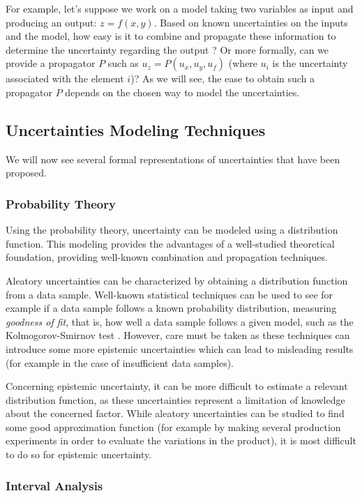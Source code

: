 For example, let's suppose we work on a model taking two variables as input and producing an output: $z=f(x,y)$.
Based on known uncertainties on the inputs and the model, how easy is it to combine and propagate these information to determine the uncertainty regarding the output ? Or more formally, can we provide a propagator $P$ such as $u_z = P(u_x, u_y, u_f)$ (where $u_i$ is the uncertainty associated with the element $i$)? As we will see, the ease to obtain such a propagator $P$ depends on the chosen way to model the uncertainties.

\subsection{Uncertainties Modeling Techniques}

We will now see several formal representations of uncertainties that have been proposed.

\subsubsection{Probability Theory}

Using the probability theory, uncertainty can be modeled using a distribution function. This modeling provides the advantages of a well-studied theoretical foundation, providing well-known combination and propagation techniques.

Aleatory uncertainties can be characterized by obtaining a distribution function from a data sample.
Well-known statistical techniques can be used to see for example if a data sample follows a known probability distribution, measuring \emph{goodness of fit}, that is, how well a data sample follows a given model, such as the Kolmogorov-Smirnov test \cite{Massey_1951}. 
However, care must be taken as these techniques can introduce some more epistemic uncertainties which can lead to misleading results (for example in the case of insufficient data samples).

Concerning epistemic uncertainty, it can be more difficult to estimate a relevant distribution function, as these uncertainties represent a limitation of knowledge about the concerned factor. While aleatory uncertainties can be studied to find some good approximation function (for example by making several production experiments in order to evaluate the variations in the product), it is most difficult to do so for epistemic uncertainty.

\subsubsection{Interval Analysis}

